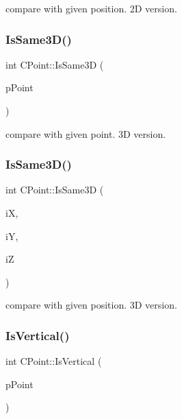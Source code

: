 compare with given position. 2D version. 

\mbox{\label{classCPoint_a5a759d36a6b0bb0e8300077f53924362}} 
\subsubsection{\texorpdfstring{IsSame3D()}{IsSame3D()}\hspace{0.1cm}{\footnotesize\ttfamily [1/2]}}
{\footnotesize\ttfamily int C\+Point\+::\+Is\+Same3D (\begin{DoxyParamCaption}\item[{\mbox{\hyperlink{classCPoint}{C\+Point}} $\ast$}]{p\+Point }\end{DoxyParamCaption})}



compare with given point. 3D version. 

\mbox{\label{classCPoint_ad6ed4f9141fd7ec648cb508bffe7edc2}} 
\subsubsection{\texorpdfstring{IsSame3D()}{IsSame3D()}\hspace{0.1cm}{\footnotesize\ttfamily [2/2]}}
{\footnotesize\ttfamily int C\+Point\+::\+Is\+Same3D (\begin{DoxyParamCaption}\item[{int}]{iX,  }\item[{int}]{iY,  }\item[{int}]{iZ }\end{DoxyParamCaption})}



compare with given position. 3D version. 

\mbox{\label{classCPoint_a888633c67f146c390bd3434850497f1f}} 
\subsubsection{\texorpdfstring{IsVertical()}{IsVertical()}}
{\footnotesize\ttfamily int C\+Point\+::\+Is\+Vertical (\begin{DoxyParamCaption}\item[{\mbox{\hyperlink{classCPoint}{C\+Point}} $\ast$}]{p\+Point }\end{DoxyParamCaption})}



